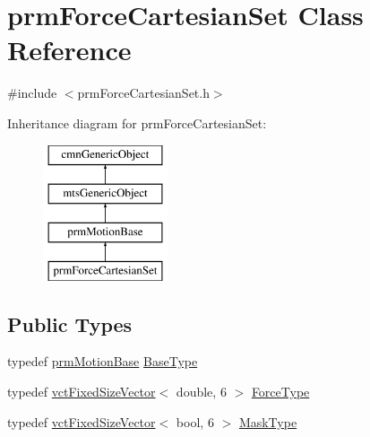 \hypertarget{classprm_force_cartesian_set}{}\section{prm\+Force\+Cartesian\+Set Class Reference}
\label{classprm_force_cartesian_set}


{\ttfamily \#include $<$prm\+Force\+Cartesian\+Set.\+h$>$}

Inheritance diagram for prm\+Force\+Cartesian\+Set\+:\begin{figure}[H]
\begin{center}
\leavevmode
\includegraphics[height=4.000000cm]{d7/d74/classprm_force_cartesian_set}
\end{center}
\end{figure}
\subsection*{Public Types}
\begin{DoxyCompactItemize}
\item 
typedef \hyperlink{classprm_motion_base}{prm\+Motion\+Base} \hyperlink{classprm_force_cartesian_set_a1b8582b968aaf818d1305d80d2f7f5df}{Base\+Type}
\item 
typedef \hyperlink{classvct_fixed_size_vector}{vct\+Fixed\+Size\+Vector}$<$ double, 6 $>$ \hyperlink{classprm_force_cartesian_set_aef7a9a5a3ce601f7d1f1c752ddb36c00}{Force\+Type}
\item 
typedef \hyperlink{classvct_fixed_size_vector}{vct\+Fixed\+Size\+Vector}$<$ bool, 6 $>$ \hyperlink{classprm_force_cartesian_set_abcc1516523be27cf3b572d0d1c463db9}{Mask\+Type}
\end{DoxyCompactItemize}
